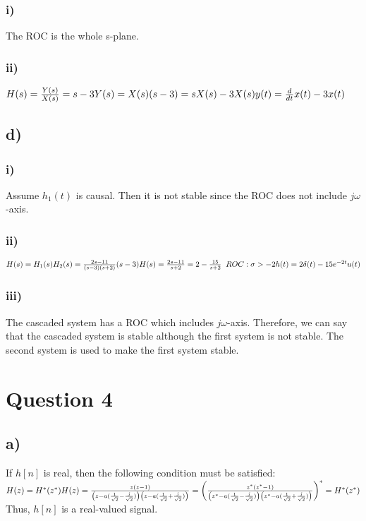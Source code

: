 \documentclass[12pt]{article}
\begin{document}
    \subsubsection*{i)}    
    The ROC is the whole s-plane.   
    
    \subsubsection*{ii)}
    \begin{math}
        H(s) = \frac{Y(s)}{X(s)} = s-3\\
        Y(s) = X(s)(s-3) = sX(s) -3X(s)\\
        y(t) = \frac{d}{dt}x(t) - 3x(t)
    \end{math}
    
    \subsection*{d)}
    \subsubsection*{i)}       
    Assume \(h_1(t)\) is causal. Then it is not stable since the ROC does not include \(j\omega\)-axis.
    \subsubsection*{ii)}
    \begin{math}
        H(s) = H_1(s)H_2(s) = \frac{2s-11}{(s-3)(s+2)}(s-3)
        H(s) = \frac{2s-11}{s+2} = 2 - \frac{15}{s+2} \;\; ROC: \sigma > -2 \\
        h(t) = 2\delta(t) - 15e^{-2t}u(t)
    \end{math}
    \subsubsection*{iii)}
    The cascaded system has a ROC which includes \(j\omega\)-axis. Therefore, we can say that the cascaded 
    system is stable although the first system is not stable. The second system is used to make the first 
    system stable.
       
    \section*{Question 4}
    \subsection*{a)}
    If \(h[n]\) is real, then the following condition must be satisfied: \begin{math} H(z) = H^{*}(z^{*}) \\
    H(z) = \frac{z(z-1)}{\left(z-a(\frac{1}{\sqrt{2}} - \frac{j}{\sqrt{2}})\right) \left(z-a(\frac{1}{\sqrt{2}} + \frac{j}{\sqrt{2}})\right)} = \left(\frac{z^{*}(z^{*}-1)}{\left(z^{*}-a(\frac{1}{\sqrt{2}} - \frac{j}{\sqrt{2}})\right) \left(z^{*}-a(\frac{1}{\sqrt{2}} + \frac{j}{\sqrt{2}})\right)}\right)^{*} = H^{*}(z^{*}) \\ \\
    \end{math} 
    Thus, \(h[n]\) is a real-valued signal. 
    
\end{document}

